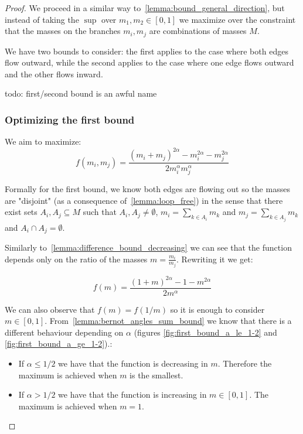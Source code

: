 \documentclass[11pt,reqno,a4paper]{amsart}
\numberwithin{equation}{section}
\theoremstyle{mytheorem}
\theoremstyle{myremark}
\theoremstyle{myparagraph}
\begin{document}
    \begin{proof}
        We proceed in a similar way to~\ref{lemma:bound_general_direction}, but instead of taking the $\sup$
        over $m_1, m_2 \in [0,1]$ we maximize over the constraint that the masses on the branches $m_i,m_j$ are combinations of masses $M$.

        We have two bounds to consider: the first applies to the case where both edges flow outward,
        while the second applies to the case where one edge flows outward and the other flows inward.

        todo: first/second bound is an awful name

        \subsubsection{Optimizing the first bound}

        We aim to maximize:
        \begin{equation}
            f(m_i, m_j) = \frac{(m_i + m_j) ^ {2\alpha} - m_i^{2\alpha} - m_j^{2\alpha}}{2m_i^\alpha m_j^\alpha}
        \end{equation}

        Formally for the first bound, we know both edges are flowing out so the masses are "disjoint" (as a consequence of~\ref{lemma:loop_free}) in the sense that there
        exist sets $A_i, A_j \subseteq M$ such that $A_i, A_j \neq \emptyset$, $m_i = \sum_{k \in A_i} m_k$ and $m_j = \sum_{k \in A_j} m_k$ and $A_i \cap A_j = \emptyset$.

        Similarly to~\ref{lemma:difference_bound_decreasing} we can see that the function depends only on the ratio of the masses $m = \frac{m_i}{m_j}$. Rewriting it we get:

        \begin{equation}
            f(m) = \frac{(1 + m) ^ {2\alpha} - 1 - m^{2\alpha}}{2m^\alpha}
        \end{equation}

        We can also observe that $f(m) = f(1/m)$ so it is enough to consider $m \in [0,1]$.
        From~\ref{lemma:bernot_angles_sum_bound} we know that there is a different behaviour depending on $\alpha$ (figures \ref{fig:first_bound_a_le_1-2} and \ref{fig:first_bound_a_ge_1-2}).:
        \begin{itemize}
            \item If $\alpha \le 1/2$ we have that the function is decreasing in $m$. Therefore the maximum is achieved when $m$ is the smallest.
            \item If $\alpha > 1/2$ we have that the function is increasing in $m \in [0,1]$. The maximum is achieved when $m = 1$.
        \end{itemize}


\end{proof}
\end{document}
